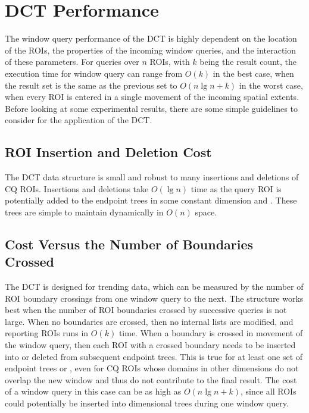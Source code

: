 \documentclass{ucdthesis}       %
\begin{document}

\section{\ac{DCT} Performance}
\label{sec:performance}

The window query performance of the \ac{DCT} is highly dependent on the
location of the \acp{ROI}, the properties of the incoming window
queries, and the interaction of these parameters.  For queries over
$n$ \acp{ROI}, with $k$ being the result count, the execution
time for window query can range from $O(k)$ in the best case, when the
result set is the same as the previous set to $O(n\lg{n}+k)$ in the
worst case, when every \ac{ROI} is entered in a single movement
of the incoming spatial extents.  Before looking at some experimental
results, there are some simple guidelines to consider for the
application of the \ac{DCT}.

\subsection{\ac{ROI} Insertion and Deletion Cost}

The \ac{DCT} data structure is small and robust to many insertions and
deletions of \ac{CQ} \acp{ROI}.  Insertions and deletions take
$O(\lg{n})$ time as the query \ac{ROI} is potentially added to the
endpoint trees in some constant dimension and .  These trees
are simple to maintain dynamically in $O(n)$ space.

\subsection{Cost Versus the Number of Boundaries Crossed}

The \ac{DCT} is designed for trending data, which can 
be measured by the number of \ac{ROI} boundary crossings from
one window query to the next. The structure works best when the
number of \ac{ROI} boundaries crossed by successive queries is not
large.  When no boundaries are crossed, then no internal lists are
modified, and reporting \acp{ROI} runs in $O(k)$ time.  When a boundary
is crossed in movement of the window query, then each \ac{ROI}
with a crossed boundary needs to be inserted into or deleted from
subsequent endpoint trees.  This is true for at least one set of
endpoint trees or , even for \ac{CQ} \acp{ROI} whose domains in other
dimensions do not overlap the new window and thus do not contribute to
the final result.  The cost of a window query in this case can be as
high as $O(n\lg{n} + k)$, since all \acp{ROI} could potentially be
inserted into dimensional trees during one window query.
\end{document}
